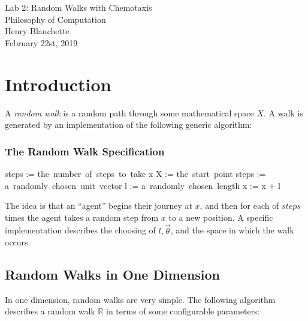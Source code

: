 \documentclass{article}
\begin{document}
\begin{center}{\huge   Lab 2: Random Walks with Chemotaxis }\\[0.4cm]{\large  Philosophy of Computation }\\[0.75cm]{\large  Henry Blanchette }\\[0.5cm]{\large  February 22st, 2019 }\\[1.0cm]\end{center}\section{Introduction}


  A \textit{random walk} is a random path through some mathematical space $  X  $. A walk is generated by an implementation of the following generic algorithm:



  \vspace{0.4cm}
  \subsubsection*{The Random Walk Specification}

\begin{adjustwidth}{1cm}{}\begin{programbox}
steps \in {} := \mbox{the number of steps to take}
x \in X := \mbox{the start point}
 \TO steps \DO
  \vec{\theta} := \mbox{a randomly chosen unit vector}
  l := \mbox{a randomly chosen length}
  x := x + l \vec{\theta}
\OD
\end{programbox}\end{adjustwidth}
 \vspace{0.6cm}


  The idea is that an ``agent'' begins their journey at $  x  $, and then for each of $  steps  $ times the agent takes a random step from $  x  $ to a new position. A specific implementation describes the choosing of $  l, \vec{\theta}  $, and the space in which the walk occurs.


\subsection{Random Walks in One Dimension}


  In one dimension, random walks are very simple. The following algorithm describes a random walk $  \mathbb{R}  $ in terms of some configurable parameters:
\end{document}
